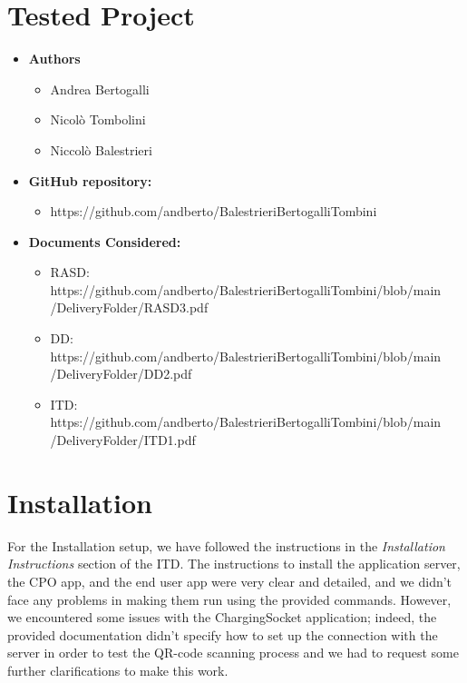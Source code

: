 \documentclass{Configuration_Files/PoliMi3i_thesis}
\begin{document}
\mainmatter %

\chapter{Tested Project}

\begin{itemize}
    \item\textbf{Authors}
        \begin{itemize}
            \item Andrea Bertogalli
            \item Nicolò Tombolini
            \item Niccolò Balestrieri
        \end{itemize}
    \item \textbf{GitHub repository:}
        \begin{itemize}
            \item https://github.com/andberto/BalestrieriBertogalliTombini
    \end{itemize}
    \item \textbf{Documents Considered:}
        \begin{itemize}
            \item RASD:\\https://github.com/andberto/BalestrieriBertogalliTombini/blob/main\\/DeliveryFolder/RASD3.pdf
            \item DD:\\https://github.com/andberto/BalestrieriBertogalliTombini/blob/main\\/DeliveryFolder/DD2.pdf
            \item ITD:\\https://github.com/andberto/BalestrieriBertogalliTombini/blob/main\\/DeliveryFolder/ITD1.pdf
    \end{itemize}
   
\end{itemize}

\chapter{Installation}

For the Installation setup, we have followed the instructions in the \emph{Installation Instructions} section of the ITD. The instructions to install the application server, the CPO app, and the end user app were very clear and detailed, and we didn't face any problems in making them run using the provided commands. However, we encountered some issues with the ChargingSocket application; indeed, the provided documentation didn't specify how to set up the connection with the server in order to test the QR-code scanning process and we had to request some further clarifications to make this work.
\end{document}
